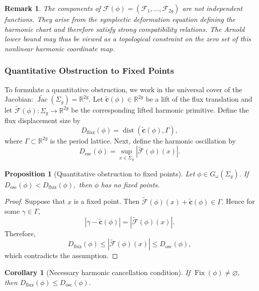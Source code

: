 \documentclass[11pt]{article}
\newtheorem{proposition}[theorem]{Proposition}
\newtheorem{corollary}[theorem]{Corollary}
\newtheorem{remark}[theorem]{Remark}
\theoremstyle{definition}
\newcommand{\Jac}{\operatorname{Jac}}
\begin{document}
	\begin{remark}
		The components of $\mathcal F(\phi) = (\mathcal F_1,\ldots,\mathcal F_{2g})$
		are not independent functions. They arise from the symplectic deformation
		equation defining the harmonic chart and therefore satisfy strong compatibility
		relations. The Arnold lower bound may thus be viewed as a topological constraint
		on the zero set of this nonlinear harmonic coordinate map.
	\end{remark}
	
	\subsubsection{Quantitative Obstruction to Fixed Points}
	
	To formulate a quantitative obstruction, we work in the universal cover of the
	Jacobian: $\widetilde{\Jac}(\Sigma_g)=\mathbb R^{2g}.$ Let $\widetilde{\mathbf
		c}(\phi)\in\mathbb R^{2g}$ be a lift of the flux translation and let
	$\widetilde{\mathcal F}(\phi): \Sigma_g\longrightarrow\mathbb R^{2g}$ be the
	corresponding lifted harmonic primitive. Define the flux displacement size by
	\[
	D_{\mathrm{flux}}(\phi) = \operatorname{dist} (\widetilde{\mathbf c}(\phi),\Gamma),
	\]
	where $\Gamma\subset\mathbb R^{2g}$ is the period lattice. Next, define the
	harmonic oscillation by
	\[
	D_{\mathrm{osc}}(\phi) = \sup_{x\in\Sigma_g} \left| \widetilde{\mathcal
		F}(\phi)(x) \right|.
	\]
	
	\begin{proposition}[Quantitative obstruction to fixed points]
		\label{prop:fixed_point_obstruction}
		Let $\phi\in G_\omega(\Sigma_g)$. If $D_{\mathrm{osc}}(\phi) <
		D_{\mathrm{flux}}(\phi),$ then $\phi$ has no fixed points.
	\end{proposition}
	
	\begin{proof}
		Suppose that $x$ is a fixed point. Then $\widetilde{\mathcal F}(\phi)(x) +
		\widetilde{\mathbf c}(\phi) \in\Gamma.$ Hence for some $\gamma\in\Gamma$,
		$$|\gamma-\widetilde{\mathbf c}(\phi)| = |\widetilde{\mathcal F}(\phi)(x)|.$$
		Therefore, $$D_{\mathrm{flux}}(\phi) \le |\widetilde{\mathcal F}(\phi)(x)| \le
		D_{\mathrm{osc}}(\phi),$$ which contradicts the assumption.
	\end{proof}
	
	\begin{corollary}[Necessary harmonic cancellation condition]
		\label{cor:harmonic_cancellation}
		If $\operatorname{Fix}(\phi)\neq\varnothing,$ then $D_{\mathrm{flux}}(\phi) \le
		D_{\mathrm{osc}}(\phi).$ 
	\end{corollary}
	
\end{document}
